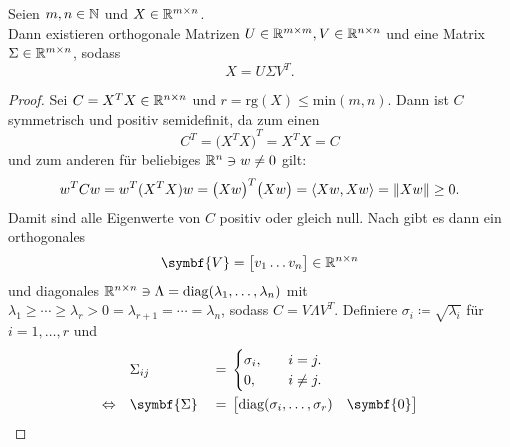 \begin{theorem}[Singulärwertzerlegung]\label{th:svd}
    Seien \(m,n\in\mathbb{N}\) und \(X \in \mathbb{R}^{m \times n}\). \\
    Dann existieren orthogonale Matrizen \(U \in \mathbb{R}^{m \times m}, V \in \mathbb{R}^{n \times n}\) und eine Matrix \(\Sigma \in \mathbb{R}^{m \times n}\), sodass
    \begin{equation*}
        X = U \Sigma V^{T}.
    \end{equation*}
\end{theorem}
\begin{proof}
    Sei \(C = X^{T}X \in \mathbb{R}^{n \times n}\) und \(r = \text{rg}(X) \leq \text{min}(m,n)\).
    Dann ist \(C\) symmetrisch und positiv semidefinit, da zum einen 
    \begin{equation*}
        C^{T} = {\big(X^{T}X\big)}^{T} = X^{T}X = C
    \end{equation*}  
    und zum anderen für beliebiges \(\mathbb{R}^{n} \ni w \neq 0\) gilt:
    \begin{equation*}
        w^{T}Cw = w^{T}(X^{T}X)w = {\big(Xw\big)}^{T}\big(Xw\big) = \langle Xw,Xw \rangle = \lVert Xw\rVert \geq 0.
    \end{equation*}
    Damit sind alle Eigenwerte von \(C\) positiv oder gleich null. 
    Nach  gibt es dann ein orthogonales 
    \begin{equation*}
        \symbf{V} =
        \big[
        \begin{matrix}
            v_1 \dots v_n
        \end{matrix}
        \big]
        \in \R^{n \times n}
    \end{equation*}
    und diagonales \(\mathbb{R}^{n \times n} \ni \Lambda = \operatorname{diag}(\lambda_1,\ldots,\lambda_n)\) mit \(\lambda_1 \geq \cdots \geq \lambda_r > 0 = \lambda_{r+1} = \cdots = \lambda_n\), sodass \(C = V \Lambda V^{T}\).    
    Definiere \(\sigma_i \coloneq \sqrt{\lambda_i}\) für \(i = 1,\ldots,r\) und
    \begin{alignat*}{2}
        &\Sigma_{ij} &{}={}& 
            \begin{cases}
                \sigma_i, \quad &i=j. \\
                0, \quad &i \neq j.
            \end{cases} \\
        \Lra \quad &\symbf{\Sigma} &{}={}&  
        \begin{bmatrix}
            \text{diag}(\sigma_i,\ldots,\sigma_r) & \symbf{0} \\

\end{bmatrix}
\end{alignat*}
\end{proof}
